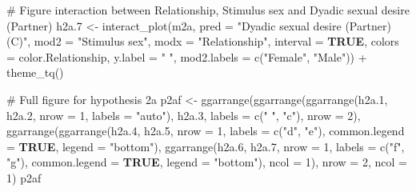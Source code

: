 \documentclass[
  bookmarksnumbered]{article}
\newenvironment{Shaded}{\begin{snugshade}}{\end{snugshade}}
\newcommand{\AttributeTok}[1]{\textcolor[rgb]{0.80,0.80,0.80}{#1}}
\newcommand{\CommentTok}[1]{\textcolor[rgb]{0.50,0.62,0.50}{#1}}
\newcommand{\ConstantTok}[1]{\textcolor[rgb]{0.86,0.64,0.64}{\textbf{#1}}}
\newcommand{\DecValTok}[1]{\textcolor[rgb]{0.86,0.86,0.80}{#1}}
\newcommand{\FloatTok}[1]{\textcolor[rgb]{0.75,0.75,0.82}{#1}}
\newcommand{\FunctionTok}[1]{\textcolor[rgb]{0.94,0.94,0.56}{#1}}
\newcommand{\NormalTok}[1]{\textcolor[rgb]{0.80,0.80,0.80}{#1}}
\newcommand{\OtherTok}[1]{\textcolor[rgb]{0.94,0.94,0.56}{#1}}
\newcommand{\SpecialCharTok}[1]{\textcolor[rgb]{0.86,0.64,0.64}{#1}}
\newcommand{\StringTok}[1]{\textcolor[rgb]{0.80,0.58,0.58}{#1}}
\begin{document}
\begin{Shaded}
\begin{Highlighting}[]
\CommentTok{\# Figure interaction between Relationship, Stimulus sex and Dyadic sexual desire (Partner)}
\NormalTok{h2a}\FloatTok{.7} \OtherTok{\textless{}{-}} \FunctionTok{interact\_plot}\NormalTok{(m2a, }\AttributeTok{pred =} \StringTok{"Dyadic sexual desire (Partner) (C)"}\NormalTok{, }
              \AttributeTok{mod2 =} \StringTok{"Stimulus sex"}\NormalTok{,}
              \AttributeTok{modx =} \StringTok{"Relationship"}\NormalTok{,}
              \AttributeTok{interval =} \ConstantTok{TRUE}\NormalTok{,}
              \AttributeTok{colors =}\NormalTok{ color.Relationship,}
              \AttributeTok{y.label =} \StringTok{" "}\NormalTok{,}
              \AttributeTok{mod2.labels =} \FunctionTok{c}\NormalTok{(}\StringTok{"Female"}\NormalTok{, }\StringTok{"Male"}\NormalTok{)) }\SpecialCharTok{+}
  \FunctionTok{theme\_tq}\NormalTok{()}

\CommentTok{\# Full figure for hypothesis 2a}
\NormalTok{p2af }\OtherTok{\textless{}{-}} \FunctionTok{ggarrange}\NormalTok{(}\FunctionTok{ggarrange}\NormalTok{(}\FunctionTok{ggarrange}\NormalTok{(h2a}\FloatTok{.1}\NormalTok{, h2a}\FloatTok{.2}\NormalTok{,}
                                      \AttributeTok{nrow =} \DecValTok{1}\NormalTok{,}
                                      \AttributeTok{labels =} \StringTok{"auto"}\NormalTok{), }
\NormalTok{                            h2a}\FloatTok{.3}\NormalTok{,}
                            \AttributeTok{labels =} \FunctionTok{c}\NormalTok{(}\StringTok{" "}\NormalTok{, }\StringTok{"c"}\NormalTok{),}
                            \AttributeTok{nrow =} \DecValTok{2}\NormalTok{), }
                  \FunctionTok{ggarrange}\NormalTok{(}\FunctionTok{ggarrange}\NormalTok{(h2a}\FloatTok{.4}\NormalTok{, h2a}\FloatTok{.5}\NormalTok{,}
                                      \AttributeTok{nrow =} \DecValTok{1}\NormalTok{,}
                                      \AttributeTok{labels =} \FunctionTok{c}\NormalTok{(}\StringTok{"d"}\NormalTok{, }\StringTok{"e"}\NormalTok{),}
                                      \AttributeTok{common.legend =} \ConstantTok{TRUE}\NormalTok{,}
                                      \AttributeTok{legend =} \StringTok{"bottom"}\NormalTok{),}
                            \FunctionTok{ggarrange}\NormalTok{(h2a}\FloatTok{.6}\NormalTok{, h2a}\FloatTok{.7}\NormalTok{,}
                                      \AttributeTok{nrow =} \DecValTok{1}\NormalTok{,}
                                      \AttributeTok{labels =} \FunctionTok{c}\NormalTok{(}\StringTok{"f"}\NormalTok{, }\StringTok{"g"}\NormalTok{),}
                                      \AttributeTok{common.legend =} \ConstantTok{TRUE}\NormalTok{,}
                                      \AttributeTok{legend =} \StringTok{"bottom"}\NormalTok{),}
                            \AttributeTok{ncol =} \DecValTok{1}\NormalTok{),}
                  \AttributeTok{nrow =} \DecValTok{2}\NormalTok{,}
                  \AttributeTok{ncol =} \DecValTok{1}\NormalTok{)}
\NormalTok{p2af}
\end{Highlighting}
\end{Shaded}
\end{document}
